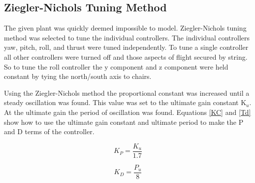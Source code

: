 \subsection{Ziegler-Nichols Tuning Method\label{PID_Tune}}

The given plant was quickly deemed impossible to model.  Ziegler-Nichols tuning method was selected to tune the individual controllers. The individual controllers yaw, pitch, roll, and thrust were tuned independently. To tune a single controller all other controllers were turned off and those aspects of flight secured by string. So to tune the roll controller the y component and z component were held constant by tying the north/south axis to chairs.  

Using the Ziegler-Nichols method the proportional constant was increased until a steady oscillation was found. This value was set to the ultimate gain constant K$_u$.  At the ultimate gain the period of oscillation was found. Equations \ref{KC} and \ref{Td} show how to use the ultimate gain constant and ultimate period to make the P and D terms of the controller. 

\begin{equation}
K_P = \frac{K_u}{1.7}
\label{KC}
\end{equation}

\begin{equation}
K_D = \frac{P_u}{8}
\label{Td}
\end{equation}


